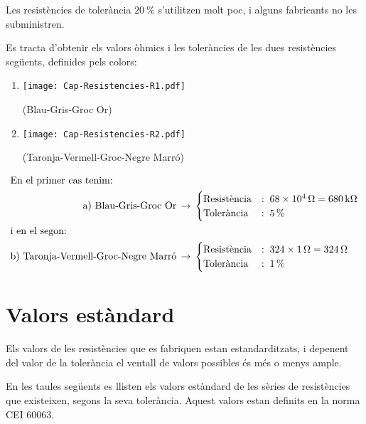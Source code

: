 Les resistències de tolerància $\SI{20}{\%}$ s'utilitzen molt poc, i alguns fabricants no les subministren.


\begin{exemple}
   Es tracta d'obtenir els valors òhmics i les toleràncies de les dues resistències següents,
   definides pels colors:
    \begin{enumerate}
       \renewcommand{\labelenumi}{\alph{enumi})}
       \item \begin{minipage}{1.8cm}
               \texttt{[image: Cap-Resistencies-R1.pdf]}
            \end{minipage} (Blau-Gris-Groc Or)
       \item  \begin{minipage}{1.8cm}
               \texttt{[image: Cap-Resistencies-R2.pdf]}
            \end{minipage} (Taronja-Vermell-Groc-Negre Marró)
    \end{enumerate}
    \begin{align*}
       \intertext{En el primer cas tenim:}
       \text{a) Blau-Gris-Groc Or}\,  &\rightarrow\,
       \begin{cases}
          \text{Resistència} &:\; \SI{68e4}{\ensuremath{\mathrm{\Omega}}} = \SI{680}{k\ensuremath{\mathrm{\Omega}}} \\
          \text{Tolerància}  &:\; \SI{5}{\%}
       \end{cases} \\
       \intertext{i en el segon:}
       \text{b) Taronja-Vermell-Groc-Negre Marró}\,  &\rightarrow\,
       \begin{cases}
          \text{Resistència} &:\;324 \times \SI{1}{\ensuremath{\mathrm{\Omega}}} = \SI{324}{\ensuremath{\mathrm{\Omega}}} \\
          \text{Tolerància}  &:\; \SI{1}{\%}
       \end{cases}
    \end{align*}
\end{exemple}

\section{Valors estàndard} 

Els valors de les resistències que es fabriquen estan estandarditzats, i depenent
del valor de la tolerància el ventall de valors possibles és més o menys ample.

En les taules següents es llisten els valors estàndard de les sèries de resistències que existeixen,  segons la seva tolerància. Aquest valors estan definits en la norma CEI 60063.

